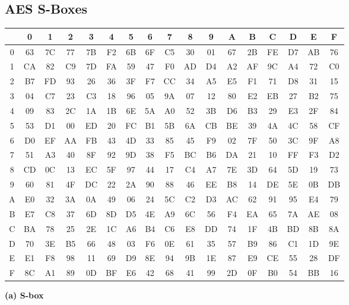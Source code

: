 \documentclass[11pt]{article}
\begin{document}
	\subsection{AES S-Boxes}
	\begin{tabular}{| c | c | c | c | c | c | c | c | c | c | c | c | c | c | c | c | c |}
		\hline 
		&0 & 1 &2& 3 &4 &5& 6& 7& 8 &9&A&B&C&D&E&F\\
		\hline 
		0 &63 &7C &77 &7B& F2& 6B& 6F& C5 &30 &01 &67 &2B &FE &D7 &AB &76\\
		\hline
		1& CA& 82& C9& 7D &FA &59 &47& F0 &AD &D4 &A2 &AF &9C &A4 &72 &C0\\
		\hline
		2 &B7 &FD &93 &26 &36 &3F &F7 &CC &34 &A5 &E5 &F1 &71 &D8 &31 &15\\
		\hline
		3& 04 &C7 &23 &C3 &18 &96 &05 &9A &07 &12 &80 &E2 &EB &27 &B2& 75\\
		\hline
		4& 09& 83& 2C& 1A& 1B& 6E& 5A& A0& 52& 3B& D6& B3& 29& E3& 2F& 84\\
		\hline
		5 &53 &D1 &00 &ED& 20& FC& B1& 5B &6A& CB &BE &39& 4A& 4C &58& CF\\
		\hline
		6& D0 &EF &AA &FB &43 &4D &33 &85 &45 &F9 &02 &7F &50 &3C &9F &A8\\
		\hline
		7 &51 &A3 &40 &8F &92 &9D &38 &F5 &BC &B6 &DA &21 &10& FF& F3& D2\\
		\hline
		8 &CD &0C &13 &EC &5F &97 &44 &17 &C4 &A7 &7E &3D &64 &5D &19 &73\\
		\hline
		9 &60 &81 &4F &DC &22 &2A &90 &88 &46 &EE &B8 &14 &DE &5E &0B &DB\\
		\hline
		A &E0 &32 &3A &0A &49 &06 &24 &5C &C2 &D3 &AC &62 &91 &95 &E4 &79\\
		\hline
		B &E7 &C8 &37 &6D &8D &D5 &4E &A9 &6C &56 &F4 &EA &65 &7A &AE &08\\
		\hline
		C &BA &78 &25 &2E &1C &A6 &B4 &C6 &E8 &DD &74 &1F &4B &BD &8B &8A\\
		\hline
		D &70 &3E &B5 &66 &48 &03 &F6 &0E &61 &35 &57 &B9 &86 &C1 &1D &9E\\
		\hline
		E &E1 &F8 &98 &11 &69 &D9 &8E &94 &9B &1E &87 &E9 &CE &55 &28 &DF\\
		\hline
		F &8C &A1 &89 &0D &BF &E6 &42 &68 &41 &99 &2D &0F &B0 &54 &BB &16\\
		\hline
	\end{tabular}\vspace{0.1cm}
	\centering\textbf{(a) S-box}\flushleft
	
\end{document}
